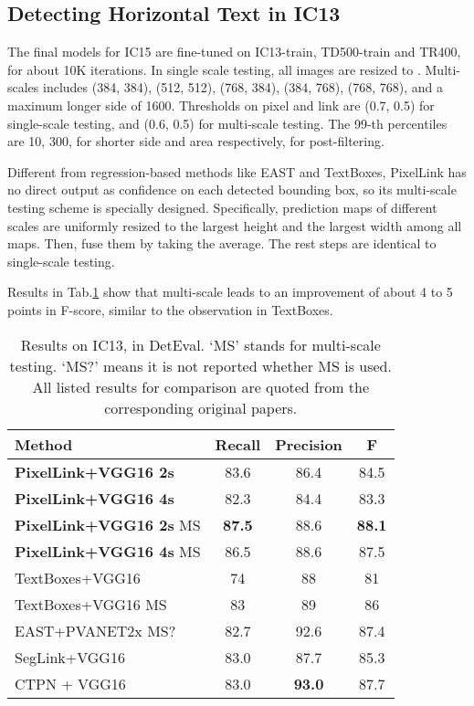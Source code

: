 \documentclass[letterpaper]{article} \usepackage{aaai18}  \usepackage{times}  \usepackage{helvet}  \usepackage{courier}  \usepackage{url}  \usepackage{graphicx}
\begin{document}
	\subsection{Detecting Horizontal Text in IC13}
	\label{sec:ic13-result}
	The final models for IC15 are fine-tuned on IC13-train, TD500-train and TR400, for about 10K iterations. In single scale testing, all images are resized to . Multi-scales includes (384, 384), (512, 512), (768, 384), (384, 768), (768, 768), and a maximum longer side of 1600. Thresholds on pixel and link are (0.7, 0.5) for single-scale testing, and (0.6, 0.5) for multi-scale testing. The 99-th percentiles are 10, 300, for shorter side and area respectively, for post-filtering.
	
	Different from regression-based methods like EAST and TextBoxes, PixelLink has no direct output as confidence on each detected bounding box, so its multi-scale testing scheme is specially designed. Specifically, prediction maps of different scales are uniformly resized to the largest height and the largest width among all maps. Then, fuse them by taking the average. The rest steps are identical to single-scale testing.
	
	Results in Tab.\ref{table:results-on-ic13} show that multi-scale leads to an improvement of about 4 to 5 points in F-score, similar to the observation in TextBoxes.
	\begin{table}
		\caption{Results on IC13, in DetEval. `MS' stands for multi-scale testing. `MS?' means it is not reported whether MS is used.  All listed results for comparison are quoted from the corresponding original papers.}
		\label{table:results-on-ic13}
		\begin{tabular}{|l|c|c|c|}
			\hline
			Method                  &Recall &Precision  &F\\
			\hline
			\hline
			\textbf{PixelLink+VGG16 2s}      &83.6   &86.4       &84.5\\ \hline
			\textbf{PixelLink+VGG16 4s}      &82.3   &84.4       &83.3\\ \hline
			\textbf{PixelLink+VGG16 2s} MS   &\textbf{87.5}  &88.6       &\textbf{88.1}\\ \hline
			\textbf{PixelLink+VGG16 4s} MS   &86.5  &88.6       &87.5\\ \hline
			TextBoxes+VGG16         &74     &88         &81  \\ \hline
			TextBoxes+VGG16 MS      &83     &89         &86  \\ \hline
			EAST+PVANET2x MS?          &82.7   &92.6       &87.4\\ \hline
			SegLink+VGG16              &83.0   &87.7       &85.3\\ \hline
			CTPN + VGG16            &83.0 &\textbf{93.0}&87.7\\ \hline
		\end{tabular}
	\end{table}
	
\end{document}
